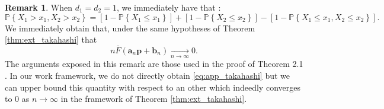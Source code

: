 \documentclass[11pt]{article}
\theoremstyle{definition}
\newtheorem{remark}{Remark}
\begin{document}
	\begin{remark}
		\label{rmk:takahashi}
		When $d_1 = d_2 = 1$, we immediately have that :
		\begin{equation*}
			\mathbb{P} \left\{ X_1 > x_1, X_2 > x_2  \right\} = \left[ 1-\mathbb{P} \left\{ X_1 \leq x_1 \right\} \right] + \left[ 1 - \mathbb{P} \left\{ X_2 \leq x_2\right\} \right] - \left[ 1- \mathbb{P}\left\{ X_1 \leq x_1, X_2 \leq x_2 \right\} \right].
		\end{equation*}
		We immediately obtain that, under the same hypotheses of Theorem \ref{thm:ext_takahashi} that
		\begin{equation}
			\label{eq:app_takahashi}
			n \bar{F}(\textbf{a}_n \textbf{p} + \textbf{b}_n) \underset{n \rightarrow \infty}{\longrightarrow} 0.
		\end{equation}
		The arguments exposed in this remark are those used in the proof of Theorem 2.1 \cite{takahashi1994asymptotic}. In our work framework, we do not directly obtain \eqref{eq:app_takahashi} but we can upper bound this quantity with respect to an other which indeedly converges to $0$ as $n\rightarrow \infty$ in the framework of Theorem \ref{thm:ext_takahashi}.
		
	\end{remark}
\end{document}
